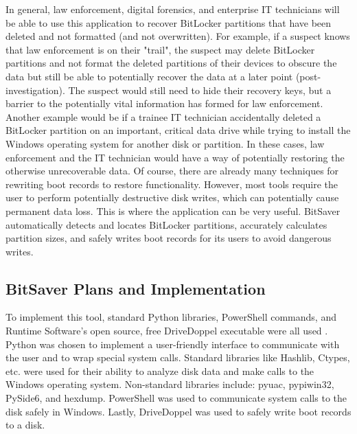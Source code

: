 \documentclass[conference]{IEEEtran} \IEEEoverridecommandlockouts
\begin{document}
In general, law enforcement, digital forensics, and enterprise IT technicians will be able
to use this application to recover BitLocker partitions that have been deleted
and not formatted (and not overwritten). For example, if a suspect knows that law enforcement is on
their "trail", the suspect may delete BitLocker partitions and not format the
deleted partitions of their devices to obscure the data but still be able to potentially recover
the data at a later point (post-investigation). The suspect would still need to
hide their recovery keys, but a barrier to the potentially vital information has formed for law
enforcement. Another example would be if a trainee IT technician accidentally
deleted a BitLocker partition on an important, critical data drive while trying
to install the Windows operating system for another disk or partition. In these cases,
law enforcement and the IT technician would have a way of potentially restoring the otherwise unrecoverable data.
Of course, there are already
many techniques for rewriting boot records to restore functionality. However,
most tools require the user to perform potentially destructive disk writes,
which can potentially cause permanent data loss. This is where the application can be very
useful. BitSaver automatically detects and locates BitLocker partitions,
accurately calculates partition sizes, and safely writes boot records for its users to avoid dangerous writes.


\subsection{BitSaver Plans and Implementation} To implement this tool, standard
Python libraries, PowerShell commands, and Runtime Software's open source, free
DriveDoppel executable were all used \cite{b7}. Python was chosen to implement a user-friendly
interface to communicate with the user and to wrap special system calls. Standard libraries like Hashlib, 
Ctypes, etc. were used for their ability to analyze disk data and make calls to the Windows operating system.
Non-standard libraries include: pyuac, pypiwin32, PySide6, and hexdump. PowerShell was used to communicate system calls to the disk safely in Windows.
Lastly, DriveDoppel was used to safely write boot records to a disk.
\end{document}
